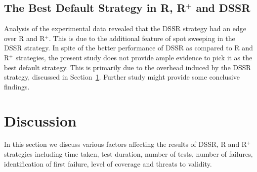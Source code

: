 
\subsection{The Best Default Strategy in R, R$^+$ and DSSR}

Analysis of the experimental data revealed that the DSSR strategy had an edge over R and R$^+$. This is due to the additional feature of spot sweeping in the DSSR strategy. In spite of the better performance of DSSR as compared to R and R$^+$ strategies, the present study does not provide ample evidence to pick it as the best default strategy. This is primarily due to the overhead induced by the DSSR strategy, discussed in Section~\ref{sec:discussion3}. Further study might provide some conclusive findings. 





\section{Discussion}\label{sec:discussion3}
In this section we discuss various factors affecting the results of DSSR, R and R$^+$ strategies including time taken, test duration, number of tests, number of failures, identification of first failure, level of coverage and threats to validity.


